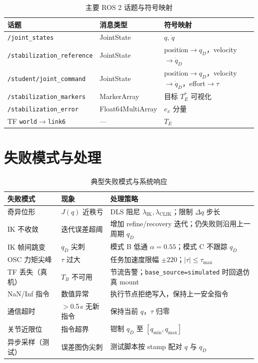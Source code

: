 \documentclass[UTF8, a4paper, 12pt]{ctexart}
\begin{document}
\begin{table}[H]
  \centering
  \caption{主要 ROS 2 话题与符号映射}
  \begin{tabular}{@{} l l l @{}}
    \toprule
    话题 & 消息类型 & 符号映射 \\
    \midrule
    \texttt{/joint\_states} & JointState & $q,\,\dot{q}$ \\
    \texttt{/stabilization\_reference} & JointState & position$\rightarrow q_D$，velocity$\rightarrow \dot{q}_D$ \\
    \texttt{/student/joint\_command} & JointState & position$\rightarrow q_D$，velocity$\rightarrow \dot{q}_D$，effort$\rightarrow \tau$ \\
    \texttt{/stabilization\_markers} & MarkerArray & 目标 $T_E^*$ 可视化 \\
    \texttt{/stabilization\_error} & Float64MultiArray & $e_x$ 分量 \\
    TF \texttt{world$\rightarrow$link6} & --- & $T_E$ \\
    \bottomrule
  \end{tabular}
\end{table}

\section{失败模式与处理}
\label{app:failure}

\begin{table}[H]
  \centering
  \caption{典型失败模式与系统响应}
  \renewcommand{\arraystretch}{1.2}
  \begin{tabular}{@{} p{3.0cm} p{4.5cm} p{6.0cm} @{}}
    \toprule
    失败模式 & 现象 & 处理策略 \\
    \midrule
    奇异位形 & $J(q)$ 近秩亏 & DLS 阻尼 $\lambda_{\mathrm{IK}},\lambda_{\mathrm{CLIK}}$；限制 $\Delta q$ 步长 \\
    IK 不收敛 & 迭代误差超阈 & 增加 refine/recovery 迭代；仍失败则沿用上一周期 $q_D$ \\
    IK 帧间跳变 & $q_D$ 尖刺 & 模式 B 低通 $\alpha=0.55$；模式 C 不跟踪 $q_D$ \\
    OSC 力矩尖峰 & $\tau$ 过大 & 任务加速度限幅 $\pm 220$；$|\tau|\le\tau_{\max}$ \\
    TF 丢失（真机） & $T_B$ 不可用 & 节流告警；\texttt{base\_source=simulated} 时回退仿真 mount \\
    NaN/Inf 指令 & 数值异常 & 执行节点拒绝写入，保持上一安全指令 \\
    通信超时 & $>$0.5\,s 无新指令 & 保持当前 $q$，$\tau$ 归零 \\
    关节近限位 & 指令超界 & 钳制 $q_D$ 至 $[q_{\min},q_{\max}]$ \\
    异步采样（测试） & 误差图伪尖刺 & 测试脚本按 stamp 配对 $q$ 与 $q_D$ \\
    \bottomrule
  \end{tabular}
\end{table}
\end{document}
